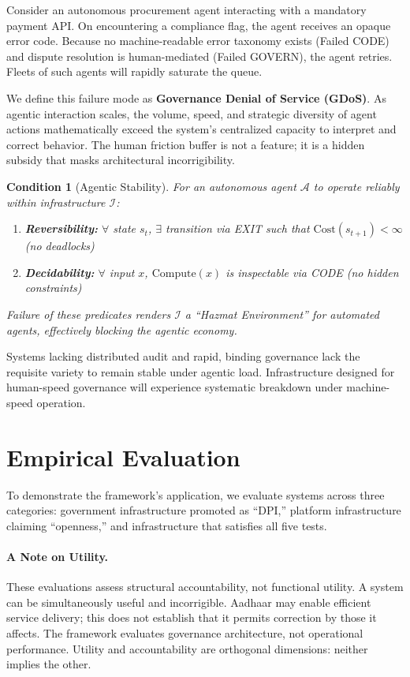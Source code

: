 \documentclass{article}
\newtheorem{condition}{Condition}
\begin{document}
Consider an autonomous procurement agent interacting with a mandatory payment API. On encountering a compliance flag, the agent receives an opaque error code. Because no machine-readable error taxonomy exists (Failed CODE) and dispute resolution is human-mediated (Failed GOVERN), the agent retries. Fleets of such agents will rapidly saturate the queue.

We define this failure mode as \textbf{Governance Denial of Service (GDoS)}. As agentic interaction scales, the volume, speed, and strategic diversity of agent actions mathematically exceed the system's centralized capacity to interpret and correct behavior. The human friction buffer is not a feature; it is a hidden subsidy that masks architectural incorrigibility.

\begin{condition}[Agentic Stability]
For an autonomous agent $\mathcal{A}$ to operate reliably within infrastructure $\mathcal{I}$:
\begin{enumerate}[noitemsep]
    \item \textbf{Reversibility:} $\forall$ state $s_t$, $\exists$ transition via EXIT such that $\text{Cost}(s_{t+1}) < \infty$ (no deadlocks)
    \item \textbf{Decidability:} $\forall$ input $x$, $\text{Compute}(x)$ is inspectable via CODE (no hidden constraints)
\end{enumerate}
Failure of these predicates renders $\mathcal{I}$ a ``Hazmat Environment'' for automated agents, effectively blocking the agentic economy.
\end{condition}

Systems lacking distributed audit and rapid, binding governance lack the requisite variety to remain stable under agentic load. Infrastructure designed for human-speed governance will experience systematic breakdown under machine-speed operation.

\section{Empirical Evaluation}
\label{sec:diagnosis}

To demonstrate the framework's application, we evaluate systems across three categories: government infrastructure promoted as ``DPI,'' platform infrastructure claiming ``openness,'' and infrastructure that satisfies all five tests.

\paragraph{A Note on Utility.} These evaluations assess structural accountability, not functional utility. A system can be simultaneously useful and incorrigible. Aadhaar may enable efficient service delivery; this does not establish that it permits correction by those it affects. The framework evaluates governance architecture, not operational performance. Utility and accountability are orthogonal dimensions: neither implies the other.
\end{document}
